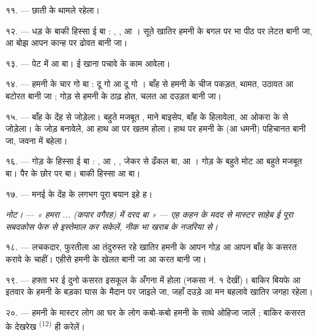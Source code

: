 ११. ---  छाती के थामले रहेला।

१२. --- धड़ के बाकी हिस्सा ई बा : , ,
 आ । सूते खातिर हमनी के बगल पर भा पीठ पर लेटत
बानी जा, आ बोझ आपन कान्ह पर ढोवत बानी जा।

१३. --- पेट में  आ  बा। ई खाना पचावे के काम
आवेला।

\VUsaut{4.4mm}
\VUsaut{3.0mm}

१४. --- हमनी के चार गो  बा : दू गो  आ दू गो
। बाँह से हमनी के चीज पकड़त, थामत, उठावत आ बटोरत बानी जा ;
गोड़ से हमनी के ठाढ़ होत, चलत आ दउड़त बानी जा।

१५. ---  बाँह के देंह से जोड़ेला। बहुते मजबूत
, माने बाइसेप, बाँह के हिलावेला, आ 
ओकरा के  से जोड़ेला।   के
जोड़ बनावेले, आ हाथ  आ  पर खतम होला। हाथ
पर हमनी के  (आ धमनी) पहिचानत बानी जा, जवना में 
बहेला।

१६. --- गोड़ के हिस्सा ई बा : ,  आ
, , जेकर 
 से ढँकल बा,  आ । गोड़ के
 बहुते मोट आ बहुते मजबूत बा। पैर के छोर पर  बा। बाकी हिस्सा  आ  बा।

१७. --- मनई के देंह के लगभग पूरा बयान इहे ह।

\textit{नोट।} --- \textit{« हमरा ... (कपार वगैरह) में दरद बा » — एह
कहन के मदद से मास्टर साहेब ई पूरा सबदकोस फेरु से इस्तेमाल कर सकेलें,
नीक भा खराब}  \textit{के नजरिया से।}

\VUsaut{5.0mm}
\VUsaut{2.4mm}
\VUsaut{3.0mm}

१८. --- लचकदार, फुरतीला आ तंदुरुस्त रहे खातिर हमनी के आपन गोड़ आ आपन
बाँह के कसरत करावे के चाहीं। एहीसे हमनी के खेलत बानी जा आ
 करत बानी जा।

१९. --- हफ्ता भर ई दुनो कसरत इसकूल के अँगना में होला (नकसा नं. १
देखीं)। बाकिर बियफे आ इतवार के हमनी के बड़का घास के मैदान पर जाइले जा,
जहाँ दउड़े आ मन बहलावे खातिर जगहा रहेला।

२०. --- हमनी के मास्टर लोग आ घर के लोग कबो-कबो हमनी के साथे ओहिजा
जालें ; बाकिर कसरत के देखरेख 
\textsuperscript{(12)} ही करेलें।

